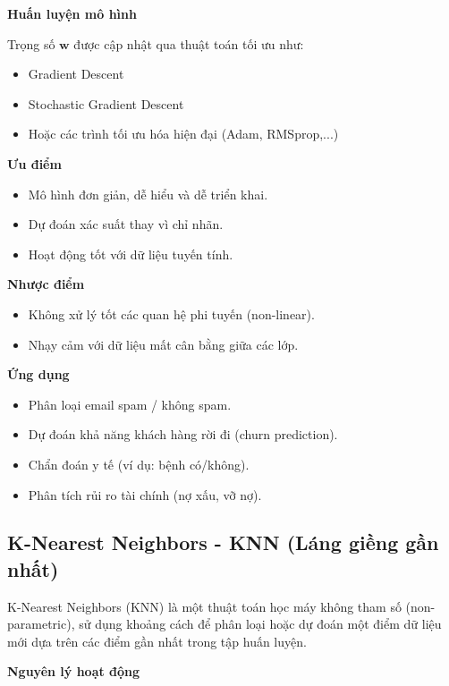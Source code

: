 \textbf{Huấn luyện mô hình}

Trọng số \( \mathbf{w} \) được cập nhật qua thuật toán tối ưu như:
\begin{itemize}
    \item Gradient Descent
    \item Stochastic Gradient Descent
    \item Hoặc các trình tối ưu hóa hiện đại (Adam, RMSprop,...)
\end{itemize}

\textbf{Ưu điểm}

\begin{itemize}
    \item Mô hình đơn giản, dễ hiểu và dễ triển khai.
    \item Dự đoán xác suất thay vì chỉ nhãn.
    \item Hoạt động tốt với dữ liệu tuyến tính.
\end{itemize}

\textbf{Nhược điểm}

\begin{itemize}
    \item Không xử lý tốt các quan hệ phi tuyến (non-linear).
    \item Nhạy cảm với dữ liệu mất cân bằng giữa các lớp.
\end{itemize}

\textbf{Ứng dụng}

\begin{itemize}
    \item Phân loại email spam / không spam.
    \item Dự đoán khả năng khách hàng rời đi (churn prediction).
    \item Chẩn đoán y tế (ví dụ: bệnh có/không).
    \item Phân tích rủi ro tài chính (nợ xấu, vỡ nợ).
\end{itemize}

\subsection {K-Nearest Neighbors - KNN (Láng giềng gần nhất)}
\label{label:knn}

K-Nearest Neighbors (KNN) là một thuật toán học máy không tham số (non-parametric), sử dụng khoảng cách để phân loại hoặc dự đoán một điểm dữ liệu mới dựa trên các điểm gần nhất trong tập huấn luyện.

\textbf{Nguyên lý hoạt động}

